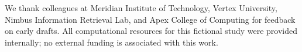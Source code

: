 \begin{acks}
We thank colleagues at Meridian Institute of Technology, Vertex University, Nimbus
Information Retrieval Lab, and Apex College of Computing for feedback on early drafts. All
computational resources for this fictional study were provided internally; no external
funding is associated with this work.
\end{acks}
